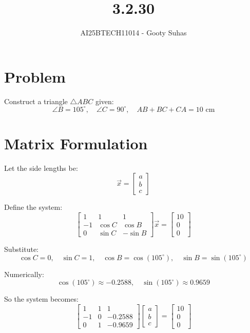 \documentclass[journal]{IEEEtran}
\begin{document}

\vspace{3cm}

\title{3.2.30}
\author{AI25BTECH11014 - Gooty Suhas}
{\let\newpage\relax\maketitle}

\renewcommand{\thefigure}{\theenumi}
\renewcommand{\thetable}{\theenumi}
\setlength{\intextsep}{10pt}
\renewcommand{\thetable}{\theenumi}

\section*{\large\textbf{Problem}}
\vspace{0.5cm}

Construct a triangle \( \triangle ABC \) given:
\[
\angle B = 105^\circ, \quad \angle C = 90^\circ, \quad AB + BC + CA = 10 \text{ cm}
\]

\section*{\large\textbf{Matrix Formulation}}
\vspace{0.5cm}

Let the side lengths be:
\[
\vec{x} = \begin{bmatrix} a \\ b \\ c \end{bmatrix}
\]

Define the system:
\[
\begin{bmatrix}
1 & 1 & 1 \\
-1 & \cos C & \cos B \\
0 & \sin C & -\sin B
\end{bmatrix}
\vec{x}
=
\begin{bmatrix}
10 \\
0 \\
0
\end{bmatrix}
\]

Substitute:
\[
\cos C = 0, \quad \sin C = 1, \quad \cos B = \cos(105^\circ), \quad \sin B = \sin(105^\circ)
\]

Numerically:
\[
\cos(105^\circ) \approx -0.2588, \quad \sin(105^\circ) \approx 0.9659
\]

So the system becomes:
\[
\begin{bmatrix}
1 & 1 & 1 \\
-1 & 0 & -0.2588 \\
0 & 1 & -0.9659
\end{bmatrix}
\begin{bmatrix}
a \\
b \\
c
\end{bmatrix}
=
\begin{bmatrix}
10 \\
0 \\
0
\end{bmatrix}
\]
\end{document}

